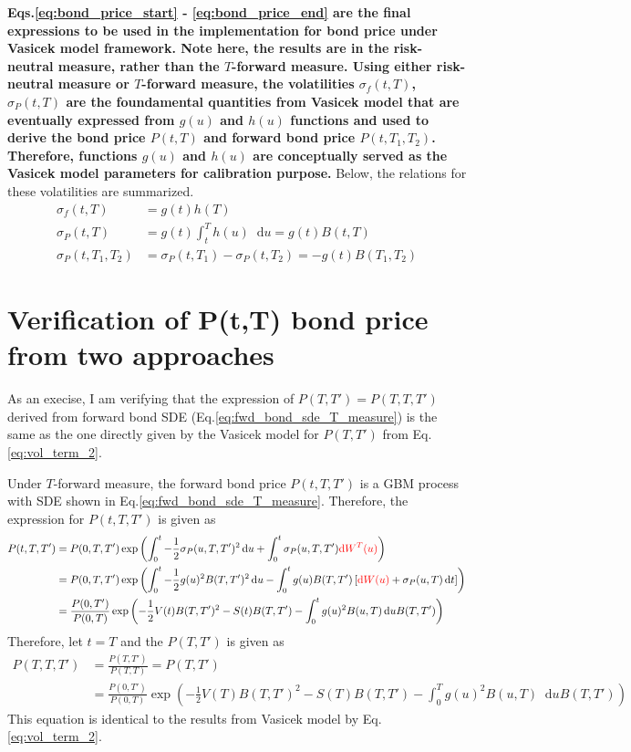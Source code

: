 \documentclass[12pt]{article}
\newcommand{\dd}{\mathop{}\!\text{d}}
\newcommand{\qBrownian}[1]{W(#1)}
\newcommand{\tBrownian}[1]{W^{T}(#1)}
\newcommand{\sigmaP}{\sigma_P}
\newcommand{\sigmaf}{\sigma_f}
\begin{document}
\textbf{Eqs.\ref{eq:bond_price_start} - \ref{eq:bond_price_end} are the final expressions to be used
in the implementation for bond price under Vasicek model framework.
{\color{red}
Note here, the results are in the risk-neutral measure,
rather than the $T$-forward measure.
}
Using either risk-neutral measure or $T$-forward measure, the volatilities $\sigmaf(t,T)$,
$\sigmaP(t,T)$ are the foundamental quantities from Vasicek model that are eventually
expressed from $g(u)$ and $h(u)$ functions and used to derive the bond price $P(t, T)$ and
forward bond price $P(t, T_1, T_2)$. Therefore, functions $g(u)$ and $h(u)$ are conceptually
served as the Vasicek model parameters for calibration purpose.}
Below, the relations for these volatilities are summarized.
\begin{align}
    \sigmaf(t, T) &= g(t) h(T) \\
    \sigmaP(t, T) & = g(t) \int_t^T h(u) \dd u = g(t) B(t, T) \\
    \sigmaP(t, T_1, T_2) &= \sigmaP(t, T_1) - \sigmaP(t, T_2) = -g(t) B(T_1, T_2)
\end{align}

\section{Verification of P(t,T) bond price from two approaches}
As an execise, I am verifying that the expression of $P(T, T') = P(T,T,T')$ derived from
forward bond SDE (Eq.\ref{eq:fwd_bond_sde_T_measure}) is the same as the one
directly given by the Vasicek model for $P(T,T')$ from Eq.\ref{eq:vol_term_2}.

Under $T$-forward measure, the forward bond price $P(t, T, T')$
is a GBM process with SDE shown in Eq.\ref{eq:fwd_bond_sde_T_measure}. Therefore,
the expression for $P(t, T, T')$ is given as
\begin{align}
    P(t, T, T') &= P(0, T, T') \exp\left(
        \int_0^t -\frac{1}{2} \sigmaP(u, T, T')^2 \dd u +
            \int_0^t \sigmaP(u, T, T') {\color{red} \dd \tBrownian{u} }
        \right) \\
        &= P(0, T, T') \exp\left(
        \int_0^t -\frac{1}{2} g(u)^2 B(T,T')^2 \dd u -
            \int_0^t g(u) B(T,T')  \left[ 
                {\color{red}\dd \qBrownian{u}} + \sigmaP(u, T) \dd t
                \right]
        \right) \\
        &= \frac{P(0, T')}{P(0, T)} \exp \left(
        -\frac{1}{2} V(t) B(T,T')^2 - S(t) B(T,T') - \int_0^t g(u)^2 B(u, T) \dd u B(T, T')
        \right)
\end{align}
Therefore, let $t = T$ and the $P(T, T')$ is given as
\begin{align}
     P(T, T, T')  &= \frac{P(T, T')}{P(T, T)} = P(T, T') \\
     &= \frac{P(0, T')}{P(0, T)} \exp \left(
        -\frac{1}{2} V(T) B(T,T')^2 - S(T) B(T,T') - \int_0^T g(u)^2 B(u, T) \dd u B(T, T')
        \right)
\end{align}
This equation is identical to the results from Vasicek model by Eq.\ref{eq:vol_term_2}.
\end{document}

